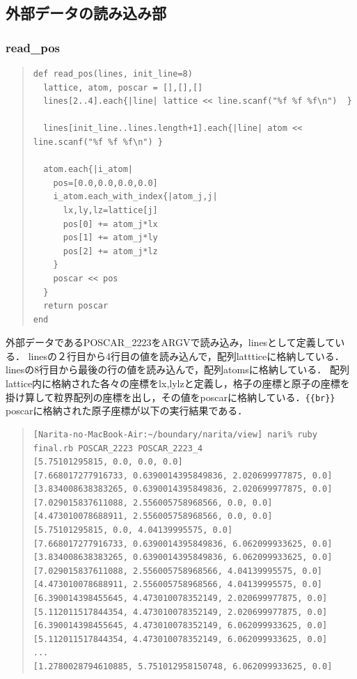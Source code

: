 \subsection{外部データの読み込み部}
\subsubsection{read\_pos}\begin{quote}\begin{verbatim}
def read_pos(lines, init_line=8)
  lattice, atom, poscar = [],[],[]
  lines[2..4].each{|line| lattice << line.scanf("%f %f %f\n")  }

  lines[init_line..lines.length+1].each{|line| atom << line.scanf("%f %f %f\n") }

  atom.each{|i_atom|
    pos=[0.0,0.0,0.0,0.0]
    i_atom.each_with_index{|atom_j,j|
      lx,ly,lz=lattice[j]
      pos[0] += atom_j*lx
      pos[1] += atom_j*ly
      pos[2] += atom_j*lz
    }
    poscar << pos
  }
  return poscar
end
\end{verbatim}\end{quote}
外部データであるPOSCAR\_2223をARGVで読み込み，linesとして定義している．
linesの２行目から4行目の値を読み込んで，配列lattticeに格納している．
linesの8行目から最後の行の値を読み込んで，配列atomsに格納している．
配列lattice内に格納された各々の座標をlx,lylzと定義し，格子の座標と原子の座標を掛け算して粒界配列の座標を出し，その値をposcarに格納している．\verb|{{br}}|
poscarに格納された原子座標が以下の実行結果である．
\begin{quote}\begin{verbatim}
[Narita-no-MacBook-Air:~/boundary/narita/view] nari% ruby final.rb POSCAR_2223 POSCAR_2223_4
[5.75101295815, 0.0, 0.0, 0.0]
[7.668017277916733, 0.6390014395849836, 2.020699977875, 0.0]
[3.834008638383265, 0.6390014395849836, 2.020699977875, 0.0]
[7.029015837611088, 2.556005758968566, 0.0, 0.0]
[4.473010078688911, 2.556005758968566, 0.0, 0.0]
[5.75101295815, 0.0, 4.04139995575, 0.0]
[7.668017277916733, 0.6390014395849836, 6.062099933625, 0.0]
[3.834008638383265, 0.6390014395849836, 6.062099933625, 0.0]
[7.029015837611088, 2.556005758968566, 4.04139995575, 0.0]
[4.473010078688911, 2.556005758968566, 4.04139995575, 0.0]
[6.390014398455645, 4.473010078352149, 2.020699977875, 0.0]
[5.112011517844354, 4.473010078352149, 2.020699977875, 0.0]
[6.390014398455645, 4.473010078352149, 6.062099933625, 0.0]
[5.112011517844354, 4.473010078352149, 6.062099933625, 0.0]
...
[1.2780028794610885, 5.751012958150748, 6.062099933625, 0.0]
\end{verbatim}\end{quote}
